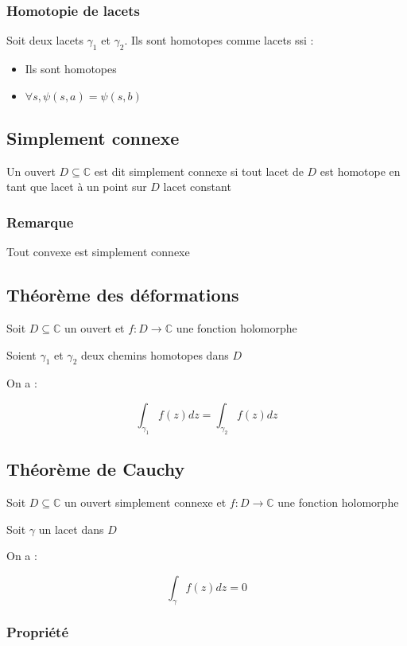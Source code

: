 \documentclass[a4paper,10pt]{report}
\newcommand{\ap}{\rightarrow}
\newcommand{\C}{\mathbb{C}}
\begin{document}
\subsubsection{Homotopie de lacets}

Soit deux lacets $\gamma_1$ et $\gamma_2$. Ils sont homotopes comme lacets ssi :

\begin{itemize}
\item{Ils sont homotopes}
\item{$\forall s, \psi(s,a) = \psi(s,b)$}
\end{itemize}

\subsection{Simplement connexe}

Un ouvert $D \subseteq \C$ est dit simplement connexe si tout lacet de $D$ est homotope en tant que lacet à un point sur $D$ lacet constant

\subsubsection{Remarque}

Tout convexe est simplement connexe

\subsection{Théorème des déformations}

Soit $D \subseteq \C$ un ouvert et $f : D \ap \C$ une fonction holomorphe

Soient $\gamma_1$ et $\gamma_2$ deux chemins homotopes dans $D$

On a :

\[ \int_{\gamma_1} f(z) dz = \int_{\gamma_2} f(z) dz \]

\subsection{Théorème de Cauchy}

Soit $D \subseteq \C$ un ouvert simplement connexe et $f : D \ap \C$ une
fonction holomorphe

Soit $\gamma$ un lacet dans $D$

On a :

\[ \int_\gamma f(z) dz = 0 \]

\subsubsection{Propriété}
\end{document}
